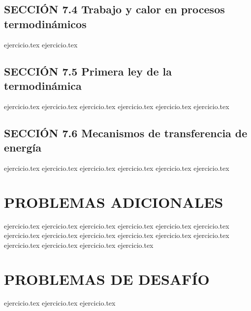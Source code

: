 \subsection*{SECCIÓN 7.4 Trabajo y calor en procesos termodinámicos}
\begin{enumerate}
    \setcounter{enumi}{14}
    {ejercicio.tex}
    {ejercicio.tex}
\end{enumerate}

\subsection*{SECCIÓN 7.5 Primera ley de la termodinámica}
\begin{enumerate}
    \setcounter{enumi}{16}
    {ejercicio.tex}
    {ejercicio.tex}
    {ejercicio.tex}
    {ejercicio.tex}
    {ejercicio.tex}
    {ejercicio.tex}
\end{enumerate}

\subsection*{SECCIÓN 7.6 Mecanismos de transferencia de energía}
\begin{enumerate}
    \setcounter{enumi}{22}
    {ejercicio.tex}
    {ejercicio.tex}
    {ejercicio.tex}
    {ejercicio.tex}
    {ejercicio.tex}
    {ejercicio.tex}
\end{enumerate}

\section*{PROBLEMAS ADICIONALES}
\begin{enumerate}
    \setcounter{enumi}{28}
    {ejercicio.tex}
    {ejercicio.tex}
    {ejercicio.tex}
    {ejercicio.tex}
    {ejercicio.tex}
    {ejercicio.tex}
    {ejercicio.tex}
    {ejercicio.tex}
    {ejercicio.tex}
    {ejercicio.tex}
    {ejercicio.tex}
    {ejercicio.tex}
    {ejercicio.tex}
    {ejercicio.tex}
    {ejercicio.tex}
    {ejercicio.tex}
\end{enumerate}

\section*{PROBLEMAS DE DESAFÍO}
\begin{enumerate}
    \setcounter{enumi}{44}
    {ejercicio.tex}
    {ejercicio.tex}
    {ejercicio.tex}
\end{enumerate}
